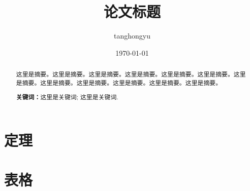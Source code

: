 \documentclass[12pt, a4paper, oneside]{ctexart}
\title{\textbf{论文标题}}
\author{tanghongyu}
\date{\today}
\newtheorem{theorem}{定理}[section]
\begin{document}
\maketitle

\setcounter{page}{0}
\maketitle
\thispagestyle{empty}
\newpage
\begin{abstract}
    这里是摘要。这里是摘要。这里是摘要。这里是摘要。这里是摘要。这里是摘要。这里是摘要。这里是摘要。这里是摘要。这里是摘要。这里是摘要。这里是摘要。
    \par\textbf{关键词：}这里是关键词; 这里是关键词.
\end{abstract}

\newpage
{}
\setcounter{page}{1}
\tableofcontents
\newpage
\setcounter{page}{1}

\section{定理}







\section{表格}

\begin{table}[htbp]
    \centering  %
    \caption{ }  %
    \label{tab1}  %
    \begin{tabular}{|c|c|c|}
    \end{tabular}
\end{table}


\begin{table}[htbp]
    \centering  %
    \caption{ }  %
    \label{tab2}  %
    \begin{adjustbox}{max width=\textwidth}
        \begin{tabular}{|c|c|c|}
        \end{tabular}
    \end{adjustbox}
\end{table}
\begin{table}[htbp]
    \centering  %
    \caption{ }  %
    \label{tab111}  %
    \begin{tabular}{|c|c|}
    \end{tabular}
\end{table}
\end{document}
